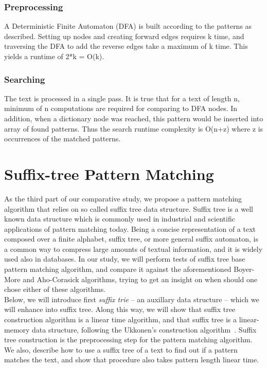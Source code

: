 \documentclass[paper=a4, fontsize=11pt]{scrartcl} %
\numberwithin{equation}{section} %
\numberwithin{figure}{section} %
\numberwithin{table}{section} %
\begin{document}
\subsubsection{Preprocessing}

A Deterministic Finite Automaton (DFA) is built according to the patterns as described. Setting up nodes and creating forward edges requires k time, and traversing the DFA to add the reverse edges take a maximum of k time. This yields a runtime of 2*k = O(k).

\subsubsection{Searching}

The text is processed in a single pass. It is true that for a text of length n, minimum of n computations are required for comparing to DFA nodes. In addition, when a dictionary node was reached, this pattern would be inserted into array of found patterns. Thus the search runtime complexity is O(n+z) where z is occurrences of the matched patterns.


\newpage

\section{Suffix-tree Pattern Matching}
As the third part of our comparative study, we propose a pattern matching algorithm that relies on so called suffix tree data structure. Suffix tree is a well known data structure which is commonly used in industrial and scientific applications of pattern matching today. Being a concise representation of a text composed over a finite alphabet, suffix tree, or more general suffix automaton, is a common way to compress large amounts of textual information, and it is widely used also in databases. In our study, we will perform tests of suffix tree base pattern matching algorithm, and compare it against the aforementioned Boyer-More and Aho-Corasick algorithms, trying to get an insight on when should one chose either of these algorithms.\\

Below, we will introduce first \textit{suffix trie} -- an auxillary data structure -- which we will enhance into suffix tree. Along this way, we will show that suffix tree construction algorithm is a linear time algorithm, and that suffix tree is a linear-memory data structure, following the Ukkonen's construction algorithm~\cite{ukkonen1995online}. Suffix tree construction is the preprocessing step for the pattern matching algorithm. We also, describe how to use a suffix tree of a text to find out if a pattern matches the text, and show that procedure also takes pattern length linear time.
\end{document}
